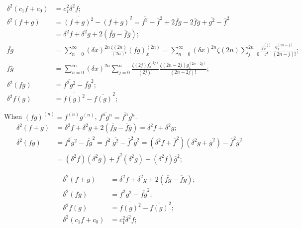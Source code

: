 \documentclass[twoside]{article}
\numberwithin{equation}{section}
\begin{document}
\begin{align*}
\delta^2 (c_1 f + c_0) &= c_1^2 \delta^2f; \\
\delta^2 (f + g) &= \overline{(f + g)^2} - \overline{(f + g)}^2 = \overline{f^2} - \overline{f}^2 + 2 \overline{f g} - 2 \overline{f} \overline{g} + \overline{g^2} - \overline{f}^2 \\
 &= \delta^2 f + \delta^2 g + 2 (\overline{fg} - \overline{f}\overline{g}); \\
\overline{f g} &= \sum_{n=0}^{\infty}(\delta x)^{2n} \frac{\zeta(2n)}{(2n)!} (f g)^{(2n)}_x 
  = \sum_{n=0}^{\infty}(\delta x)^{2n} \zeta(2n) \sum_{j=0}^{2n} \frac{f^{(j)}_x}{j!} \frac{g^{(2n - j)}_x}{(2n - j)!};  \\
\overline{f} \overline{g} &= \sum_{n=0}^{\infty}(\delta x)^{2n} \sum_{j=0}^{n} \frac{\zeta(2j) f^{(2j)}_x}{(2j)!} \frac{\zeta(2n - 2j) g^{(2n - 2j)}_x}{(2n - 2j)!};  \\
\delta^2 (f g) &= \overline{f^2 g^2} - \overline{f g}^2; \\
\delta^2 f(g) &= \overline{f(g)^2} - \overline{f(g)}^2;
\end{align*}

When $(f g)^{(n)} = f^{(n)} g^{(n)}$, $\overline{f^n g^n} = \overline{f^n} \overline{g^n}$.
\begin{align*}
\delta^2 (f + g) &= \delta^2 f + \delta^2 g + 2 (\overline{fg} - \overline{f}\overline{g}) =  \delta^2 f + \delta^2 g;  \\
\delta^2 (f g) &= \overline{f^2 g^2} - \overline{f g}^2 = \overline{f^2}\;\overline{g^2} - \overline{f}^2 \overline{g}^2
  = (\delta^2 f + \overline{f}^2)(\delta^2 g + \overline{g}^2) - \overline{f}^2 \overline{g}^2 \\
  &= (\delta^2 f) (\delta^2 g) + \overline{f}^2 (\delta^2 g) + (\delta^2 f) \overline{g}^2; 
\end{align*}

\fi

\begin{align}
\label{eqn: sum variance}
\delta^2 (f + g) &= \delta^2 f + \delta^2 g + 2 (\overline{fg} - \overline{f}\overline{g}); \\
\label{eqn: prod variance}
\delta^2 (f g) &= \overline{f^2 g^2} - \overline{f g}^2; \\
\label{eqn: composite variance}
\delta^2 f(g) &= \overline{f(g)^2} - \overline{f(g)}^2; \\
\label{eqn: linear variance}
\delta^2 (c_1 f + c_0) &= c_1^2 \delta^2f; 
\end{align}
\end{document}
